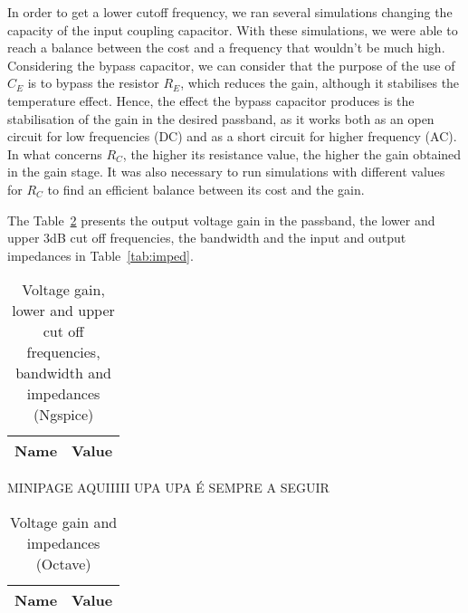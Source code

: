  In order to get a lower cutoff frequency, we ran several simulations changing the capacity of the input coupling capacitor. With these simulations, we were able to reach a balance between the cost and a frequency that wouldn't be much high.
  Considering the bypass capacitor, we can consider that the purpose of the use of $C_E$ is to bypass the resistor $R_E$, which reduces the gain, although it stabilises the temperature effect. Hence, the effect the bypass capacitor produces is the stabilisation of the gain in the desired passband, as it works both as an open circuit for low frequencies (DC) and as a short circuit for higher frequency (AC).
  In what concerns $R_C$, the higher its resistance value, the higher the gain obtained in the gain stage. It was also necessary to run simulations with different values for $R_C$ to find an efficient balance between its cost and the gain.

The Table~\ref{tab:spice} presents the output voltage gain in the passband, the lower and upper 3dB cut off frequencies, the bandwidth and the input and output impedances in Table~\ref{tab:imped}.

\begin{table}[H]
 \centering
 \begin{tabular}{|l|r|}
 \hline
 {\bf Name} & {\bf Value} \\ \hline


 \end{tabular}
 \caption{Voltage gain, lower and upper cut off frequencies, bandwidth and impedances (Ngspice)}
 \label{tab:spice}
 \end{table}
 
 MINIPAGE AQUIIIII UPA UPA É SEMPRE A SEGUIR
 
 \begin{table}[H]
 \centering
 \begin{tabular}{|l|r|}
 \hline
 {\bf Name} & {\bf Value} \\ \hline


 \end{tabular}
 \caption{Voltage gain and impedances (Octave)}
 \label{tab:spice}
 \end{table}


